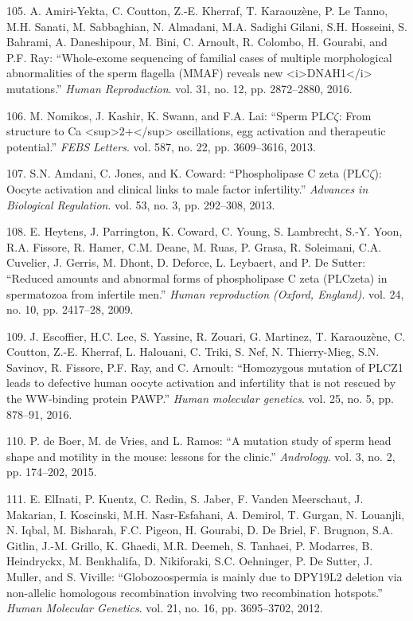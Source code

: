 \documentclass[12pt,a4paper,twoside]{ugathesis}
\theoremstyle{definition}
\theoremstyle{definition}
\theoremstyle{definition}
\theoremstyle{remark}
\begin{document}
\hypertarget{ref-Amiri-Yekta2016}{}
105. A. Amiri-Yekta, C. Coutton, Z.-E. Kherraf, T. Karaouzène, P. Le
Tanno, M.H. Sanati, M. Sabbaghian, N. Almadani, M.A. Sadighi Gilani,
S.H. Hosseini, S. Bahrami, A. Daneshipour, M. Bini, C. Arnoult, R.
Colombo, H. Gourabi, and P.F. Ray: ``Whole-exome sequencing of familial
cases of multiple morphological abnormalities of the sperm flagella
(MMAF) reveals new
\textless{}i\textgreater{}DNAH1\textless{}/i\textgreater{} mutations.''
\emph{Human Reproduction}. vol. 31, no. 12, pp. 2872--2880, 2016.

\hypertarget{ref-Nomikos2013}{}
106. M. Nomikos, J. Kashir, K. Swann, and F.A. Lai: ``Sperm
PLC\(\zeta\): From structure to Ca
\textless{}sup\textgreater{}2+\textless{}/sup\textgreater{}
oscillations, egg activation and therapeutic potential.'' \emph{FEBS
Letters}. vol. 587, no. 22, pp. 3609--3616, 2013.

\hypertarget{ref-Amdani2013}{}
107. S.N. Amdani, C. Jones, and K. Coward: ``Phospholipase C zeta
(PLC\(\zeta\)): Oocyte activation and clinical links to male factor
infertility.'' \emph{Advances in Biological Regulation}. vol. 53, no. 3,
pp. 292--308, 2013.

\hypertarget{ref-Heytens2009}{}
108. E. Heytens, J. Parrington, K. Coward, C. Young, S. Lambrecht, S.-Y.
Yoon, R.A. Fissore, R. Hamer, C.M. Deane, M. Ruas, P. Grasa, R.
Soleimani, C.A. Cuvelier, J. Gerris, M. Dhont, D. Deforce, L. Leybaert,
and P. De Sutter: ``Reduced amounts and abnormal forms of phospholipase
C zeta (PLCzeta) in spermatozoa from infertile men.'' \emph{Human
reproduction (Oxford, England)}. vol. 24, no. 10, pp. 2417--28, 2009.

\hypertarget{ref-Escoffier2016}{}
109. J. Escoffier, H.C. Lee, S. Yassine, R. Zouari, G. Martinez, T.
Karaouzène, C. Coutton, Z.-E. Kherraf, L. Halouani, C. Triki, S. Nef, N.
Thierry-Mieg, S.N. Savinov, R. Fissore, P.F. Ray, and C. Arnoult:
``Homozygous mutation of PLCZ1 leads to defective human oocyte
activation and infertility that is not rescued by the WW-binding protein
PAWP.'' \emph{Human molecular genetics}. vol. 25, no. 5, pp. 878--91,
2016.

\hypertarget{ref-DeBoer2015}{}
110. P. de Boer, M. de Vries, and L. Ramos: ``A mutation study of sperm
head shape and motility in the mouse: lessons for the clinic.''
\emph{Andrology}. vol. 3, no. 2, pp. 174--202, 2015.

\hypertarget{ref-ElInati2012}{}
111. E. ElInati, P. Kuentz, C. Redin, S. Jaber, F. Vanden Meerschaut, J.
Makarian, I. Koscinski, M.H. Nasr-Esfahani, A. Demirol, T. Gurgan, N.
Louanjli, N. Iqbal, M. Bisharah, F.C. Pigeon, H. Gourabi, D. De Briel,
F. Brugnon, S.A. Gitlin, J.-M. Grillo, K. Ghaedi, M.R. Deemeh, S.
Tanhaei, P. Modarres, B. Heindryckx, M. Benkhalifa, D. Nikiforaki, S.C.
Oehninger, P. De Sutter, J. Muller, and S. Viville: ``Globozoospermia is
mainly due to DPY19L2 deletion via non-allelic homologous recombination
involving two recombination hotspots.'' \emph{Human Molecular Genetics}.
vol. 21, no. 16, pp. 3695--3702, 2012.
\end{document}
